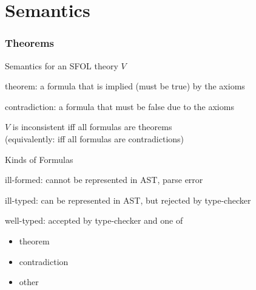 
\section{Semantics}

\begin{frame}\frametitle{Theorems}
\begin{blockitems}{Semantics for an SFOL theory $V$}
\item theorem: a formula that is implied (must be true) by the axioms
\item contradiction: a formula that must be false due to the axioms
\item $V$ is inconsistent iff all formulas are theorems \\ (equivalently: iff all formulas are contradictions)
\end{blockitems}

\begin{blockitems}{Kinds of Formulas}
\item ill-formed: cannot be represented in AST, parse error
\item ill-typed: can be represented in AST, but rejected by type-checker
\item well-typed: accepted by type-checker and one of
\begin{itemize}
\item theorem
\item contradiction
\item other
\end{itemize}
\end{blockitems}
\end{frame}


